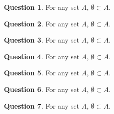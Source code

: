\documentclass[a4paper,12pt,reqno]{amsart}
\theoremstyle{definition}
\newtheorem{quest}{Question}
\begin{document}
\begin{quest}
For any set $A$, $\emptyset \subset A$.
\end{quest}

\begin{quest}
For any set $A$, $\emptyset \subset A$.
\end{quest}

\begin{quest}
For any set $A$, $\emptyset \subset A$.
\end{quest}

\begin{quest}
For any set $A$, $\emptyset \subset A$.
\end{quest}

\begin{quest}
For any set $A$, $\emptyset \subset A$.
\end{quest}

\begin{quest}
For any set $A$, $\emptyset \subset A$.
\end{quest}

\begin{quest}
For any set $A$, $\emptyset \subset A$.
\end{quest}
\end{document}
